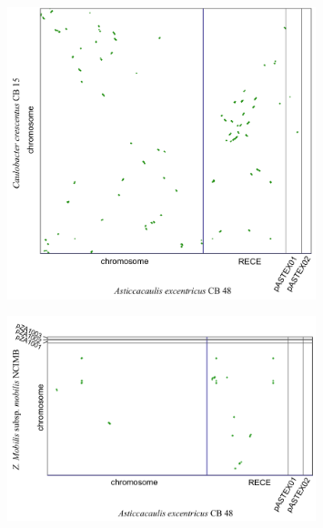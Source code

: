 \begin{figure}[H]
	\begin{center}
	\begin{minipage}{0.5\textwidth}
	\centering
	\includegraphics[width=0.8\textwidth]{./img/synteny/new/fig8_5a.png}
   	\label{figsyntasticca1}
	\end{minipage}
	\end{center} 

	\begin{center}
	\begin{minipage}{0.5\textwidth}
	\centering
	\includegraphics[width=0.8\textwidth]{./img/synteny/new/fig8_5b.png}
	\label{figsyntasticca2}
	\end{minipage}
	\end{center} 


\end{figure}
